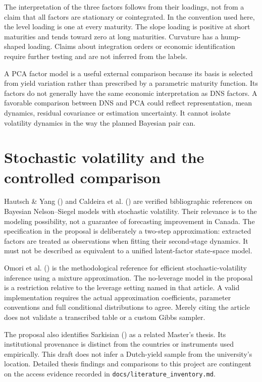 \documentclass[
  12pt,
  letterpaper,
  DIV=11,
  numbers=noendperiod]{scrreprt}
\begin{document}
The interpretation of the three factors follows from their loadings, not
from a claim that all factors are stationary or cointegrated. In the
convention used here, the level loading is one at every maturity. The
slope loading is positive at short maturities and tends toward zero at
long maturities. Curvature has a hump-shaped loading. Claims about
integration orders or economic identification require further testing
and are not inferred from the labels.

A PCA factor model is a useful external comparison because its basis is
selected from yield variation rather than prescribed by a parametric
maturity function. Its factors do not generally have the same economic
interpretation as DNS factors. A favorable comparison between DNS and
PCA could reflect representation, mean dynamics, residual covariance or
estimation uncertainty. It cannot isolate volatility dynamics in the way
the planned Bayesian pair can.

\section{Stochastic volatility and the controlled
comparison}\label{stochastic-volatility-and-the-controlled-comparison}

Hautsch \& Yang () and Caldeira
et al. () are verified
bibliographic references on Bayesian Nelson--Siegel models with
stochastic volatility. Their relevance is to the modeling possibility,
not a guarantee of forecasting improvement in Canada. The specification
in the proposal is deliberately a two-step approximation: extracted
factors are treated as observations when fitting their second-stage
dynamics. It must not be described as equivalent to a unified
latent-factor state-space model.

Omori et al. () is the
methodological reference for efficient stochastic-volatility inference
using a mixture approximation. The no-leverage model in the proposal is
a restriction relative to the leverage setting named in that article. A
valid implementation requires the actual approximation coefficients,
parameter conventions and full conditional distributions to agree.
Merely citing the article does not validate a transcribed table or a
custom Gibbs sampler.

The proposal also identifies Sarkisian
() as a related Master's
thesis. Its institutional provenance is distinct from the countries or
instruments used empirically. This draft does not infer a Dutch-yield
sample from the university's location. Detailed thesis findings and
comparisons to this project are contingent on the access evidence
recorded in \texttt{docs/literature\_inventory.md}.
\end{document}
